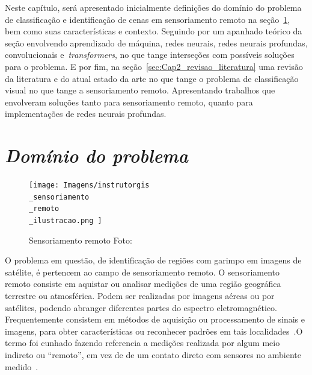 Neste capítulo, será apresentado inicialmente definições do domínio do problema de classificação e identificação de cenas em sensoriamento remoto na seção~\ref{sec:Cap2_dominio}, bem como suas características e contexto. Seguindo por um apanhado teórico da seção envolvendo aprendizado de máquina, redes neurais, redes neurais profundas, convolucionais e~\textit{transformers}, no que tange interseções com possíveis soluções para o problema.
E por fim, na seção~\ref{sec:Cap2_revisao_literatura} uma revisão da literatura e do atual estado da arte no que tange o problema de classificação visual no que tange a sensoriamento remoto. Apresentando trabalhos que envolveram soluções tanto para sensoriamento remoto, quanto para implementações de redes neurais profundas.



\section{\textit{Domínio do problema}}\label{sec:Cap2_dominio}
\begin{figure}[!ht]
    \centering
    \texttt{[image: 
        Imagens/instrutorgis\\\_sensoriamento\\\_remoto\\\_ilustracao.png
    ]}
    \caption{Sensoriamento remoto Foto:}
\label{fig:sensoriamento}
\end{figure}

O problema em questão, de identificação de regiões com garimpo em imagens de satélite, é pertencem ao campo de sensoriamento remoto. O sensoriamento remoto consiste em aquistar ou analisar medições de uma região geográfica terrestre ou atmosférica. Podem ser realizadas por imagens aéreas ou por satélites, podendo abranger diferentes partes do espectro eletromagnético.
Frequentemente consistem em métodos de aquisição ou processamento de sinais e imagens, para obter características ou reconhecer padrões em tais localidades~\cite{emery2017introduction}.O termo foi cunhado fazendo referencia a medições realizada por algum meio indireto ou “remoto”, em vez de de um contato direto com sensores no ambiente medido~\cite{emery2017introduction}.


